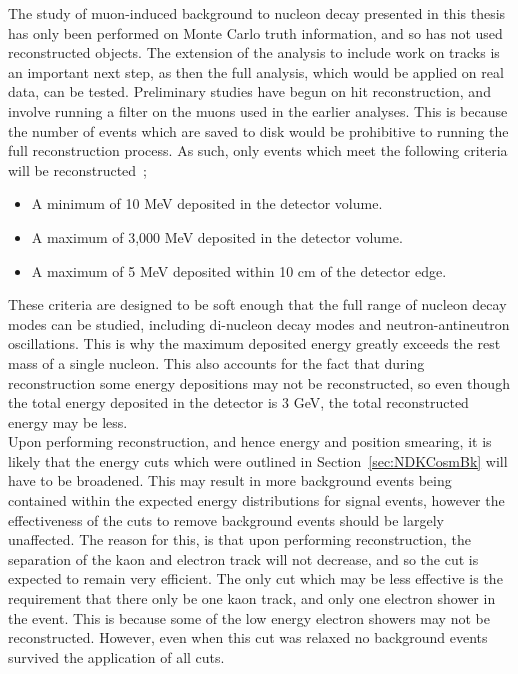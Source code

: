 The study of muon-induced background to nucleon decay presented in this thesis has only been performed on Monte Carlo truth information, and so has not used reconstructed objects. The extension of the analysis to include work on tracks is an important next step, as then the full analysis, which would be applied on real data, can be tested. Preliminary studies have begun on hit reconstruction, and involve running a filter on the muons used in the earlier analyses. This is because the number of events which are saved to disk would be prohibitive to running the full reconstruction process. As such, only events which meet the following criteria will be reconstructed~\citep{CosmoJanCollabMeeting};
\begin{itemize}
\item A minimum of 10 MeV deposited in the detector volume.
\item A maximum of 3,000 MeV deposited in the detector volume.
\item A maximum of 5 MeV deposited within 10 cm of the detector edge.
\end{itemize}
These criteria are designed to be soft enough that the full range of nucleon decay modes can be studied, including di-nucleon decay modes and neutron-antineutron oscillations. This is why the maximum deposited energy greatly exceeds the rest mass of a single nucleon. This also accounts for the fact that during reconstruction some energy depositions may not be reconstructed, so even though the total energy deposited in the detector is 3 GeV, the total reconstructed energy may be less. \\

Upon performing reconstruction, and hence energy and position smearing, it is likely that the energy cuts which were outlined in Section~\ref{sec:NDKCosmBk} will have to be broadened. This may result in more background events being contained within the expected energy distributions for signal events, however the effectiveness of the cuts to remove background events should be largely unaffected. The reason for this, is that upon performing reconstruction, the separation of the kaon and electron track will not decrease, and so the cut is expected to remain very efficient. The only cut which may be less effective is the requirement that there only be one kaon track, and only one electron shower in the event. This is because some of the low energy electron showers may not be reconstructed. However, even when this cut was relaxed no background events survived the application of all cuts. \\

